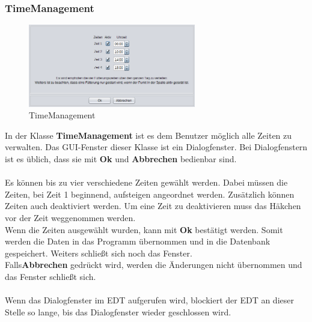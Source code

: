 \subsubsection{TimeManagement}\label{subsubsec:TimeManagement}
\begin{figure}
\vspace{-20pt}
  \begin{center}
    \includegraphics[width=0.65\textwidth]{Bilder/GUI/TimeManagement}
  \end{center}
  \caption{TimeManagement}
  \label{TimeManagement}
  \vspace{0pt}
\end{figure}
In der Klasse \textbf{TimeManagement} ist es dem Benutzer möglich alle Zeiten zu verwalten. Das GUI-Fenster dieser Klasse ist ein Dialogfenster. Bei Dialogfenstern ist es üblich, dass sie mit \textbf{Ok} und \textbf{Abbrechen} bedienbar sind.
\\ \\ Es können bis zu vier verschiedene Zeiten gewählt werden. Dabei müssen die Zeiten, bei Zeit 1 beginnend, aufsteigen angeordnet werden. Zusätzlich können Zeiten auch deaktiviert werden. Um eine Zeit zu deaktivieren muss das Häkchen vor der Zeit weggenommen werden.
\\ Wenn die Zeiten ausgewählt wurden, kann mit \textbf{Ok} bestätigt werden. Somit werden die Daten in das Programm übernommen und in die Datenbank gespeichert. Weiters schließt sich noch das Fenster.
\\ Falls\textbf{Abbrechen} gedrückt wird, werden die Änderungen nicht übernommen und das Fenster schließt sich.
\\ \\ Wenn das Dialogfenster im EDT aufgerufen wird, blockiert der EDT an dieser Stelle so lange, bis das Dialogfenster wieder geschlossen wird.

\newpage

